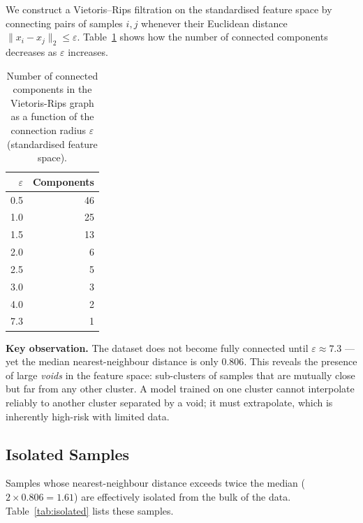 \documentclass[12pt,a4paper]{article}
\begin{document}
We construct a Vietoris--Rips filtration \citep{Edelsbrunner2010, Zomorodian2005} on the standardised feature space
by connecting pairs of samples $i,j$ whenever their Euclidean distance
$\|x_i - x_j\|_2 \leq \varepsilon$.
Table~\ref{tab:connectivity} shows how the number of connected components
decreases as $\varepsilon$ increases.

\begin{table}[h]
\centering
\caption{Number of connected components in the Vietoris-Rips graph as a
  function of the connection radius $\varepsilon$ (standardised feature
  space).}
\label{tab:connectivity}
\begin{tabular}{rr}
\toprule
$\varepsilon$ & Components \\
\midrule
0.5  & 46 \\
1.0  & 25 \\
1.5  & 13 \\
2.0  &  6 \\
2.5  &  5 \\
3.0  &  3 \\
4.0  &  2 \\
7.3  &  1 \\
\bottomrule
\end{tabular}
\end{table}

\noindent\textbf{Key observation.}  The dataset does not become fully
connected until $\varepsilon \approx 7.3$ — yet the median nearest-neighbour
distance is only $0.806$.  This reveals the presence of large \emph{voids}
in the feature space: sub-clusters of samples that are mutually close but
far from any other cluster.  A model trained on one cluster cannot
interpolate reliably to another cluster separated by a void; it must
extrapolate, which is inherently high-risk with limited data.

\subsection{Isolated Samples}

Samples whose nearest-neighbour distance exceeds twice the median
($2 \times 0.806 = 1.61$) are effectively isolated from the bulk of the
data.  Table~\ref{tab:isolated} lists these samples.
\end{document}
